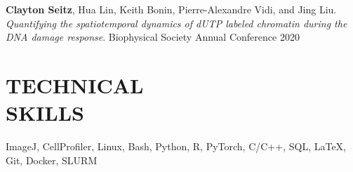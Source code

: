 \documentclass[margin, 10pt]{res} %
\begin{document}
\begin{resume}
\textbf{Clayton Seitz}, Hua Lin, Keith Bonin, Pierre-Alexandre Vidi, and Jing Liu. \textit{Quantifying the spatiotemporal dynamics of dUTP labeled chromatin during the DNA damage response}. Biophysical Society Annual Conference 2020


\section{TECHNICAL \\ SKILLS} 

ImageJ, CellProfiler, Linux, Bash, Python, R, PyTorch, C/C++, SQL, LaTeX, Git, Docker, SLURM\\

\end{resume}
\end{document}
